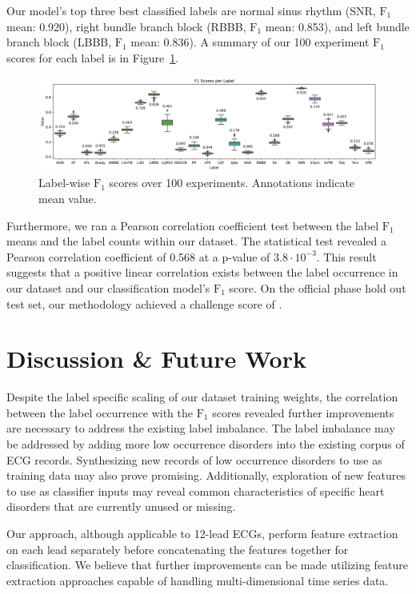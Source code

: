 \documentclass[twocolumn]{cinc}
\begin{document}
Our model's top three best classified labels are normal sinus rhythm (SNR, $\text{F}_1$ mean: 0.920), right bundle branch block (RBBB, $\text{F}_1$ mean: 0.853), and left bundle branch block (LBBB, $\text{F}_1$ mean: 0.836).
A summary of our 100 experiment $\text{F}_1$ scores for each label is in Figure~\ref{fig:f1_score}.

\begin{figure}[ht]
  \centering
  \includegraphics[width=17.0cm]{fig/label_f1s.png}
  \caption{Label-wise $\text{F}_1$ scores over 100 experiments. Annotations indicate mean value.}
  \label{fig:f1_score}
\end{figure}

Furthermore, we ran a Pearson correlation coefficient test between the label $\text{F}_1$ means and the label counts within our dataset.
The statistical test revealed a Pearson correlation coefficient of 0.568 at a p-value of $3.8 \cdot 10^{-3}$.
This result suggests that a positive linear correlation exists between the label occurrence in our dataset and our classification model's $\text{F}_1$ score.
On the official phase hold out test set, our methodology achieved a challenge score of \officialscore.


\section{Discussion \& Future Work}

Despite the label specific scaling of our dataset training weights, the correlation between the label occurrence with the $\text{F}_1$ scores revealed further improvements are necessary to address the existing label imbalance.
The label imbalance may be addressed by adding more low occurrence disorders into the existing corpus of ECG records.
Synthesizing new records of low occurrence disorders to use as training data may also prove promising.
Additionally, exploration of new features to use as classifier inputs may reveal common characteristics of specific heart disorders that are currently unused or missing.

Our approach, although applicable to 12-lead ECGs, perform feature extraction on each lead separately before concatenating the features together for classification.
We believe that further improvements can be made utilizing feature extraction approaches capable of handling multi-dimensional time series data.
\end{document}
